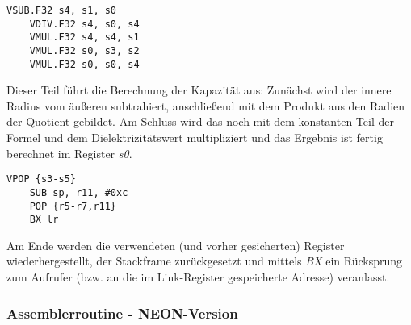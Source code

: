 \documentclass[11pt]{scrartcl}
\begin{document}
\begin{lstlisting}[language={[x86masm]Assembler}]
	VSUB.F32 s4, s1, s0
	VDIV.F32 s4, s0, s4
	VMUL.F32 s4, s4, s1
	VMUL.F32 s0, s3, s2
	VMUL.F32 s0, s0, s4
\end{lstlisting}
Dieser Teil führt die Berechnung der Kapazität aus: Zunächst wird der innere Radius vom äußeren subtrahiert, anschließend mit dem Produkt aus den Radien der Quotient gebildet. Am Schluss wird das noch mit dem konstanten Teil der Formel und dem Dielektrizitätswert multipliziert und das Ergebnis ist fertig berechnet im Register \emph{s0}.
\begin{lstlisting}[language={[x86masm]Assembler}]
	VPOP {s3-s5}
	SUB sp, r11, #0xc
	POP {r5-r7,r11}
	BX lr
\end{lstlisting}
Am Ende werden die verwendeten (und vorher gesicherten) Register wiederhergestellt, der Stackframe zurückgesetzt und mittels \emph{BX} ein Rücksprung zum Aufrufer (bzw. an die im Link-Register gespeicherte Adresse) veranlasst.

\subsubsection{Assemblerroutine - NEON-Version}
\end{document}
